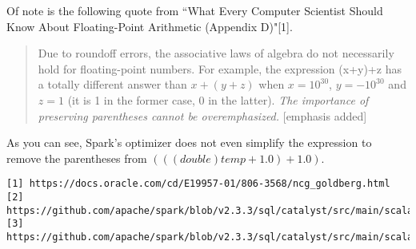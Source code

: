 \documentclass[12pt]{article}
\begin{document}
Of note is the following quote from ``What Every Computer Scientist Should Know About Floating-Point Arithmetic (Appendix D)"[1]. 

\begin{quote}
Due to roundoff errors, the associative laws of algebra do not necessarily hold for floating-point numbers. For example, the expression (x+y)+z has a totally different answer than $x+(y+z)$ when $x = 10^{30}$, $y = -10^{30}$ and $z = 1$ (it is 1 in the former case, 0 in the latter). \textit{The importance of preserving parentheses cannot be overemphasized.} [emphasis added]
\end{quote}

As you can see, Spark's optimizer does not even simplify the expression to remove the parentheses from $(((double)temp + 1.0) + 1.0)$.


\begin{tiny}
\begin{verbatim}
[1] https://docs.oracle.com/cd/E19957-01/806-3568/ncg_goldberg.html
[2] https://github.com/apache/spark/blob/v2.3.3/sql/catalyst/src/main/scala/org/apache/spark/sql/catalyst/optimizer/expressions.scala#L156
[3] https://github.com/apache/spark/blob/v2.3.3/sql/catalyst/src/main/scala/org/apache/spark/sql/catalyst/optimizer/expressions.scala#L188
\end{verbatim}
\end{tiny}
\end{document}
